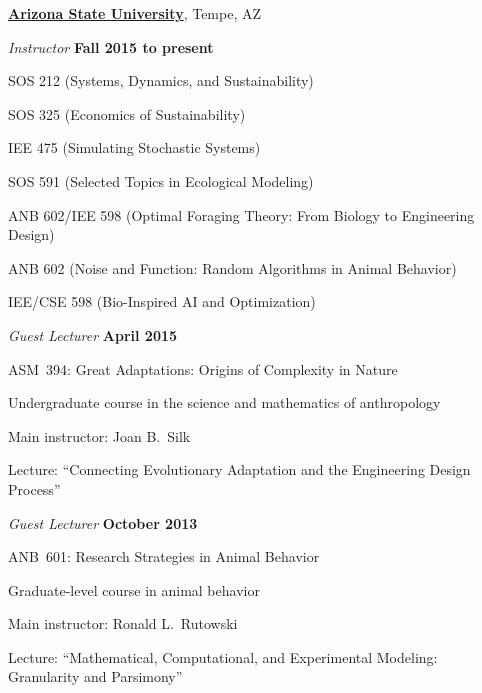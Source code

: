 \documentclass[10pt]{article}           %
\begin{document}
\href{http://www.asu.edu/}{\textbf{Arizona State University}},
Tempe, AZ
\begin{outerlist}

\item[] \textit{Instructor} \hfill \textbf{Fall 2015 to present}
    \begin{innerlist}
        \item SOS 212 (Systems, Dynamics, and Sustainability)
        \item SOS 325 (Economics of Sustainability)
        \item IEE 475 (Simulating Stochastic Systems)
        \item SOS 591 (Selected Topics in Ecological Modeling)
        \item ANB 602/IEE 598
            (Optimal Foraging Theory: From Biology to Engineering Design)
        \item ANB 602
            (Noise and Function: Random Algorithms in Animal Behavior)
        \item IEE/CSE 598
            (Bio-Inspired AI and Optimization)
    \end{innerlist}

\item[] \textit{Guest Lecturer} \hfill \textbf{April 2015}
    \begin{innerlist}
        \item ASM~394: Great Adaptations: Origins of Complexity in Nature
        \begin{innerlist}
            \item Undergraduate course in the science and mathematics of anthropology
            \item Main instructor: Joan B.~Silk
            \item Lecture: ``Connecting Evolutionary Adaptation and the Engineering Design Process''
        \end{innerlist}
    \end{innerlist}

\item[] \textit{Guest Lecturer} \hfill \textbf{October 2013}
    \begin{innerlist}
        \item ANB~601: Research Strategies in Animal Behavior
        \begin{innerlist}
            \item Graduate-level course in animal behavior
            \item Main instructor: Ronald L.~Rutowski
            \item Lecture: ``Mathematical, Computational, and Experimental Modeling: Granularity and Parsimony''
        \end{innerlist}
    \end{innerlist}

\end{outerlist}
\end{document}
